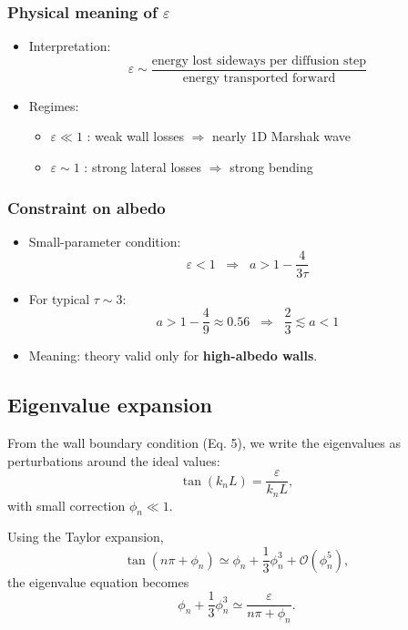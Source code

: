 \documentclass{article}
\begin{document}
    \subsubsection*{Physical meaning of $\varepsilon$}
    \begin{itemize}
    \item Interpretation:
    \[
    \varepsilon \sim 
    \frac{\text{energy lost sideways per diffusion step}}
    {\text{energy transported forward}}
    \]
    \item Regimes:
    \begin{itemize}
        \item $\varepsilon \ll 1$ : weak wall losses $\Rightarrow$ nearly 1D Marshak wave
        \item $\varepsilon \sim 1$ : strong lateral losses $\Rightarrow$ strong bending
    \end{itemize}
    \end{itemize}

    \subsubsection*{Constraint on albedo}
    \begin{itemize}
    \item Small-parameter condition:
    \[
    \varepsilon < 1 \;\;\Rightarrow\;\; a > 1 - \frac{4}{3\tau}
    \]
    \item For typical $\tau \sim 3$:
    \[
    a > 1 - \frac{4}{9} \approx 0.56
    \;\;\Rightarrow\;\;
    \frac{2}{3} \lesssim a < 1
    \]
    \item Meaning: theory valid only for \textbf{high-albedo walls}.
    \end{itemize}

\subsection*{Eigenvalue expansion}

From the wall boundary condition (Eq. 5), we write the eigenvalues as perturbations around the ideal values:
\begin{equation}
\tan(k_n L) = \frac{\varepsilon}{k_n L},
\end{equation}
with small correction $\phi_n \ll 1$.

Using the Taylor expansion,
\begin{equation}
\tan(n\pi + \phi_n) \simeq \phi_n + \frac{1}{3}\phi_n^3 + \mathcal{O}(\phi_n^5),
\end{equation}
the eigenvalue equation becomes
\[
\phi_n + \frac{1}{3}\phi_n^3 \simeq \frac{\varepsilon}{n\pi + \phi_n}.
\]
\end{document}
